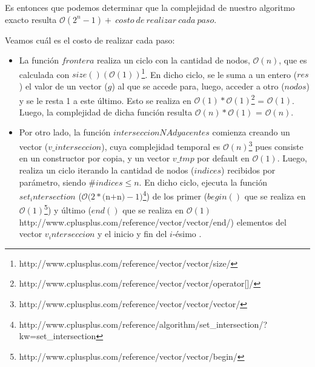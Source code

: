 Es entonces que podemos determinar que la complejidad de nuestro algoritmo exacto resulta $\mathcal{O}(2^n - 1) +\ costo\ de\ realizar\ cada\ paso$.

Veamos cuál es el costo de realizar cada paso:
\begin{itemize}
\item La función $frontera$ realiza un ciclo con la cantidad de nodos, $\mathcal{O}(n)$, que es calculada con $size()(\mathcal{O}(1))$\footnote{http://www.cplusplus.com/reference/vector/vector/size/}. En dicho ciclo, se le suma a un entero ($res$) el valor de un vector ($g$) al que se accede para, luego, acceder a otro ($nodos$) y se le resta 1 a este último. Esto se realiza en $\mathcal{O}(1)*\mathcal{O}(1)$\footnote{http://www.cplusplus.com/reference/vector/vector/operator[]/} = $\mathcal{O}(1)$. Luego, la complejidad de dicha función resulta $\mathcal{O}(n)*\mathcal{O}(1)$ = $\mathcal{O}(n)$.
\item Por otro lado, la función $interseccionNAdyacentes$ comienza creando un vector ($v\_interseccion$), cuya complejidad temporal es $\mathcal{O}(n)$\footnote{http://www.cplusplus.com/reference/vector/vector/vector/} pues consiste en un constructor por copia, y un vector $v\_tmp$ por default en $\mathcal{O}(1)$. Luego, realiza un ciclo iterando la cantidad de nodos ($indices$) recibidos por parámetro, siendo $\#indices \leq n$. En dicho ciclo, ejecuta la función $set_intersection$ ($\mathcal{O}(2*($n$+$n$)-1)$\footnote{http://www.cplusplus.com/reference/algorithm/set_intersection/?kw=set_intersection}) de los primer ($begin()$ que se realiza en $\mathcal{O}(1)$\footnote{http://www.cplusplus.com/reference/vector/vector/begin/}) y último ($end()$ que se realiza en $\mathcal{O}(1)$http://www.cplusplus.com/reference/vector/vector/end/) elementos del vector $v_interseccion$ y el inicio y fin del $i$-ésimo . 
\end{itemize}
































